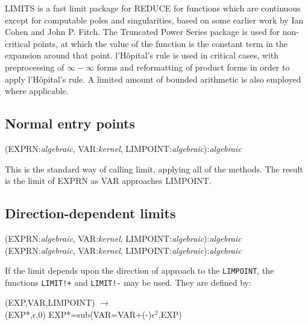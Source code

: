 
LIMITS is a fast limit package for REDUCE for functions which are
continuous except for computable poles and singularities, based on some
earlier work by Ian Cohen and John P. Fitch.  The Truncated Power Series
package is used for non-critical points, at which the value of the
function is the constant term in the expansion around that point.
l'H\^opital's rule is used in critical cases, with preprocessing of
$\infty - \infty$ forms and reformatting of product forms in order
to apply l'H\^opital's rule.  A limited amount of bounded arithmetic
is also employed where applicable.

\subsection{Normal entry points}
\hypertarget{operator:LIMIT}{}
\vspace{.1in}
(EXPRN:{\em algebraic}, VAR:{\em kernel},
LIMPOINT:{\em algebraic}):{\em algebraic}
\vspace{.1in}

This is the standard way of calling limit, applying all of the methods. The
result is the limit of EXPRN as VAR approaches LIMPOINT.


\subsection{Direction-dependent limits}

 
\hypertarget{operator:LIMIT+}{}
\hypertarget{operator:LIMIT-}{}
\vspace{.1in}
(EXPRN:{\em algebraic}, VAR:{\em kernel},
LIMPOINT:{\em algebraic}):{\em algebraic} \\
(EXPRN:{\em algebraic}, VAR:{\em kernel},
LIMPOINT:{\em algebraic}):{\em algebraic}
\vspace{.1in}

If the limit depends upon the direction of approach to the {\tt LIMPOINT},
the functions {\tt LIMIT!+} and {\tt LIMIT!-} may be used.  They are
defined by:

\vspace{.1in}
 (EXP,VAR,LIMPOINT) $\rightarrow$ \\
\hspace*{2em}{\tt LIMIT}(EXP*,$\epsilon$,0)
EXP*=sub(VAR=VAR+(-)$\epsilon^2$,EXP)

